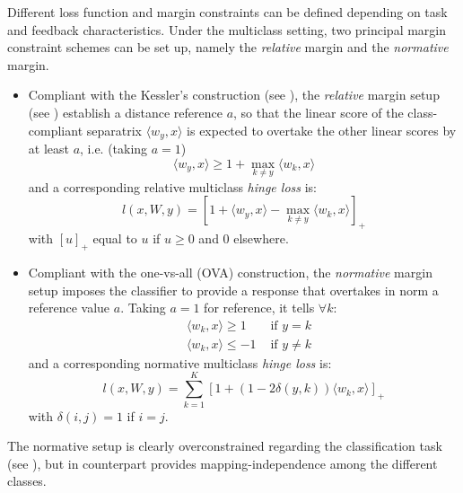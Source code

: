 \documentclass[preprint,12pt,authoryear]{elsarticle}
\begin{document}
Different loss function and margin constraints can be defined depending on task and feedback characteristics. 
Under the multiclass setting, two principal margin constraint schemes can be set up, namely the \emph{relative} margin and the \emph{normative} margin. 

\begin{itemize}
	\item Compliant with the Kessler's construction (see \cite{duda1973pattern}), the \emph{relative} margin setup (see \cite{crammer2003ultraconservative}) establish a distance reference $a$, so that the linear score of the class-compliant separatrix $\langle w_y, x\rangle$ is expected to overtake  the other linear scores by at least $a$, i.e. (taking $a=1$)
	\begin{equation}
	\label{eq:rel} \langle w_y, x \rangle \geq 1 + \max_{k \neq y} \langle w_k, x \rangle  	
	\end{equation}
	and a corresponding relative multiclass \emph{hinge loss} is:
	\begin{equation}
	\label{eq:rel-loss} l (x,W,y) =  \left[ 1 +  \langle w_y, x \rangle - \max_{k \neq y} \langle w_k, x\rangle\right]_+\end{equation}
	with $[u]_+$ equal to $u$ if $u\geq 0$ and 0 elsewhere.
	\item  Compliant with the one-vs-all (OVA) construction, the \emph{normative} margin setup imposes the classifier to provide a response that overtakes in norm a reference value $a$. Taking  $a = 1$ for reference, it tells $\forall k$: \begin{align}%
	&\langle w_k, x \rangle \geq 1 &\text{ if } y = k \label{eq:OVA-A}\\
	&\langle w_k, x \rangle \leq -1 &\text{ if }y \neq k \label{eq:OVA-B}
	\end{align}
	and a corresponding normative multiclass \emph{hinge loss} is:  
	\begin{equation}\label{eq:OVA-loss} l(x,W,y) = \sum_{k=1}^K \left[1 + (1 - 2 \delta(y,k)) \langle w_k,x \rangle\right]_+
	\end{equation}
	with $\delta(i,j) =1$ if $i = j$.
\end{itemize}


The normative setup is clearly overconstrained regarding the classification task (see \cite{crammer2003ultraconservative}), but in counterpart provides mapping-independence among the different classes.

\end{document}
